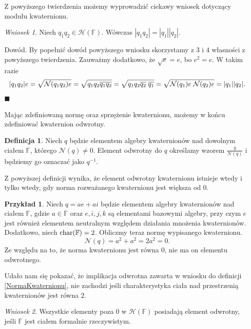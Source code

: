 \documentclass[a4paper,twoside,11pt,reqno]{mwrep}
\theoremstyle{plain} \newtheorem{twr}{Twierdzenie}
\theoremstyle{plain} \newtheorem{lem}{Lemat}
\theoremstyle{definition} \newtheorem{defi}{Definicja}
\theoremstyle{remark} \newtheorem*{wni}{Wniosek}
\theoremstyle{definition} \newtheorem{uwaga}{Uwaga}
\theoremstyle{definition}\newtheorem{prz}{Przykład}
\newenvironment{dowod}{\par\vspace{0.1cm}\par{\sc Dowód.}}{\hfill $\blacksquare$\par\vspace{0.4cm}\par}
\begin{document}
Z powyższego twierdzenia możemy wyprowadzić ciekawy wniosek dotyczący modułu kwaternionu. 
\begin{wni}
Niech $q_1q_2\in\mathcal{H}(\mathbb{F})$. Wówczas
$|q_1q_2|=|q_1||q_2|.$
\end{wni}
\begin{dowod}
By popełnić dowód powyższego wniosku skorzystamy z $\mathit{3}$ i $\mathit{4}$ własności z powyższego twierdzenia. Zauważmy
dodatkowo, że $\sqrt{e} = e$, bo $e^2 = e$. W takim razie
$$|q_1q_2|e =\sqrt{\mathcal{N}(q_1q_2)e}= \sqrt{q_1q_2\overline{q_1q_2}}=
\sqrt{q_1q_2\overline{q_2}\hspace{1mm}\overline{q_1}} = 
\sqrt{\mathcal{N}(q_1)e\hspace{1mm}\mathcal{N}(q_2)e}=|q_1||q_2|.$$
\end{dowod}
Mając zdefiniowaną normę oraz sprzężenie kwaternionu, możemy w końcu zdefiniować kwaternion odwrotny.

\begin{defi}
Niech $q$ będzie elementem algebry kwaternionów nad dowolnym ciałem 
$\mathbb{F}$, którego $\mathcal{N}(q) \neq 0 $. Element odwrotny do $q$ określamy wzorem
$\frac{\overline{q}}{\mathcal{N}(q)}$ i będziemy go oznaczać jako $q^{-1}$.
\end{defi}

Z powyższej definicji wynika, że element odwrotny kwaternionu istnieje wtedy i tylko wtedy, gdy
norma rozważanego kwaternionu jest większa od $0$.

\begin{prz}
Niech $q  = ae+ai$ będzie elementem algebry kwaternionów nad ciałem 
$\mathbb{F}$, gdzie $a\in\mathbb{F}$ oraz $e,i,j,k$ są elementami bazowymi algebry, 
przy czym  $e$ jest również elementem neutralnym względem działania mnożenia kwaternionów.
Dodatkowo, niech $\textup{char}(\mathbb{F})=2$. Obliczmy teraz normę wypisanego kwaternionu.
$$\mathcal{N}(q) = a^2 +a^2 = 2a^2 = 0.$$
Ze względu na to, że norma kwaternionu jest równa $0$, nie ma on elementu odwrotnego.
\end{prz}

Udało nam się pokazać, że implikacja odwrotna zawarta 
w wniosku do definicji \ref{NormaKwaternionu}, nie zachodzi jeśli charakterystyka ciała nad przestrzenią kwaternionów jest równa $2$. 

\begin{wni}
Wszystkie elementy poza $0$ w $\mathcal{H}\left( \mathbb{F}\right)$ posiadają
element odwrotny, jeśli $\mathbb{F}$ jest ciałem formalnie rzeczywistym.
\end{wni}
\end{document}
